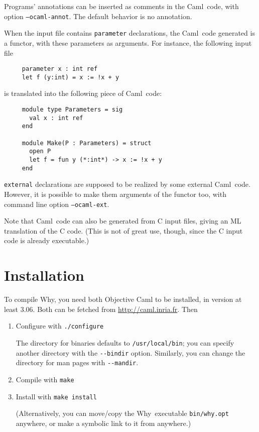 \documentclass[a4paper,12pt]{report}
\newcommand{\caml}{\textsf{Caml}}
\newcommand{\why}{\textsf{Why}}
\begin{document}
Programs' annotations can be inserted as comments in the \caml\ code,
with option \texttt{--ocaml-annot}. The default behavior is no
annotation. 

When the input file contains \texttt{parameter} declarations, the
\caml\ code generated is a functor, with these parameters as
arguments. For instance, the following input file
\begin{verbatim}
     parameter x : int ref
     let f (y:int) = x := !x + y
\end{verbatim}
is translated into the following piece of \caml\ code:
\begin{verbatim}
     module type Parameters = sig
       val x : int ref
     end

     module Make(P : Parameters) = struct
       open P
       let f = fun y (*:int*) -> x := !x + y
     end
\end{verbatim}
\texttt{external} declarations are supposed to be realized by some
external \caml\ code. However, it is possible to make them arguments
of the functor too, with command line option \texttt{--ocaml-ext}.

Note that \caml\ code can also be generated from C input files, giving
an ML translation of the C code. (This is not of great use, though,
since the C input code is already executable.)


\section{Installation}
\label{install}

To compile \why, you need both \textsf{Objective Caml} to be
installed, in version at least 3.06. Both can 
be fetched from \url{http://caml.inria.fr}.
Then 

\begin{enumerate}
\item Configure with \texttt{./configure}

  The directory for binaries defaults to \texttt{/usr/local/bin}; you
  can specify another directory with the \texttt{-{}-bindir}
  option. Similarly, you can change the directory for man pages with
  \texttt{-{}-mandir}.

\item Compile with \texttt{make}

\item Install with \texttt{make install}

  (Alternatively, you can move/copy the \why\ executable
  \texttt{bin/why.opt} anywhere, or make a symbolic link to it from anywhere.)
\end{enumerate}
\end{document}
